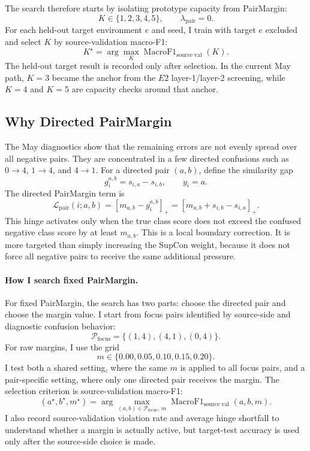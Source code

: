 \documentclass[11pt]{article}
\newcommand{\loss}{\mathcal{L}}
\begin{document}
The search therefore starts by isolating prototype capacity from PairMargin:
\[
K \in \{1,2,3,4,5\},\qquad \lambda_{\mathrm{pair}}=0.
\]
For each held-out target environment $e$ and seed, I train with target $e$ excluded and select $K$ by source-validation macro-F1:
\[
K^\star
=
\arg\max_{K}
\operatorname{MacroF1}_{\mathrm{source\;val}}(K).
\]
The held-out target result is recorded only after selection. In the current May path, $K=3$ became the anchor from the $E2$ layer-1/layer-2 screening, while $K=4$ and $K=5$ are capacity checks around that anchor.

\subsection{Why Directed PairMargin}

The May diagnostics show that the remaining errors are not evenly spread over all negative pairs. They are concentrated in a few directed confusions such as $0{\rightarrow}4$, $1{\rightarrow}4$, and $4{\rightarrow}1$. For a directed pair $(a,b)$, define the similarity gap
\[
g_i^{a,b}=s_{i,a}-s_{i,b},\qquad y_i=a.
\]
The directed PairMargin term is
\[
\loss_{\mathrm{pair}}(i;a,b)
=
\left[m_{a,b}-g_i^{a,b}\right]_+
=
\left[m_{a,b}+s_{i,b}-s_{i,a}\right]_+.
\]
This hinge activates only when the true class score does not exceed the confused negative class score by at least $m_{a,b}$. This is a local boundary correction. It is more targeted than simply increasing the SupCon weight, because it does not force all negative pairs to receive the same additional pressure.

\paragraph{How I search fixed PairMargin.}
For fixed PairMargin, the search has two parts: choose the directed pair and choose the margin value. I start from focus pairs identified by source-side and diagnostic confusion behavior:
\[
\mathcal{P}_{\mathrm{focus}}=\{(1,4),(4,1),(0,4)\}.
\]
For raw margins, I use the grid
\[
m\in\{0.00,0.05,0.10,0.15,0.20\}.
\]
I test both a shared setting, where the same $m$ is applied to all focus pairs, and a pair-specific setting, where only one directed pair receives the margin. The selection criterion is source-validation macro-F1:
\[
(a^\star,b^\star,m^\star)
=
\arg\max_{(a,b)\in\mathcal{P}_{\mathrm{focus}},\,m}
\operatorname{MacroF1}_{\mathrm{source\;val}}(a,b,m).
\]
I also record source-validation violation rate and average hinge shortfall to understand whether a margin is actually active, but target-test accuracy is used only after the source-side choice is made.
\end{document}
